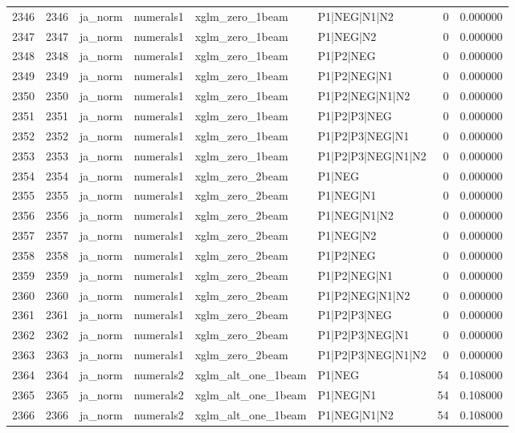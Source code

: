 \begin{tabular}{lrllllrr}
2346 & 2346 & ja_norm & numerals1 & xglm_zero_1beam & P1|NEG|N1|N2 & 0 & 0.000000 \\
2347 & 2347 & ja_norm & numerals1 & xglm_zero_1beam & P1|NEG|N2 & 0 & 0.000000 \\
2348 & 2348 & ja_norm & numerals1 & xglm_zero_1beam & P1|P2|NEG & 0 & 0.000000 \\
2349 & 2349 & ja_norm & numerals1 & xglm_zero_1beam & P1|P2|NEG|N1 & 0 & 0.000000 \\
2350 & 2350 & ja_norm & numerals1 & xglm_zero_1beam & P1|P2|NEG|N1|N2 & 0 & 0.000000 \\
2351 & 2351 & ja_norm & numerals1 & xglm_zero_1beam & P1|P2|P3|NEG & 0 & 0.000000 \\
2352 & 2352 & ja_norm & numerals1 & xglm_zero_1beam & P1|P2|P3|NEG|N1 & 0 & 0.000000 \\
2353 & 2353 & ja_norm & numerals1 & xglm_zero_1beam & P1|P2|P3|NEG|N1|N2 & 0 & 0.000000 \\
2354 & 2354 & ja_norm & numerals1 & xglm_zero_2beam & P1|NEG & 0 & 0.000000 \\
2355 & 2355 & ja_norm & numerals1 & xglm_zero_2beam & P1|NEG|N1 & 0 & 0.000000 \\
2356 & 2356 & ja_norm & numerals1 & xglm_zero_2beam & P1|NEG|N1|N2 & 0 & 0.000000 \\
2357 & 2357 & ja_norm & numerals1 & xglm_zero_2beam & P1|NEG|N2 & 0 & 0.000000 \\
2358 & 2358 & ja_norm & numerals1 & xglm_zero_2beam & P1|P2|NEG & 0 & 0.000000 \\
2359 & 2359 & ja_norm & numerals1 & xglm_zero_2beam & P1|P2|NEG|N1 & 0 & 0.000000 \\
2360 & 2360 & ja_norm & numerals1 & xglm_zero_2beam & P1|P2|NEG|N1|N2 & 0 & 0.000000 \\
2361 & 2361 & ja_norm & numerals1 & xglm_zero_2beam & P1|P2|P3|NEG & 0 & 0.000000 \\
2362 & 2362 & ja_norm & numerals1 & xglm_zero_2beam & P1|P2|P3|NEG|N1 & 0 & 0.000000 \\
2363 & 2363 & ja_norm & numerals1 & xglm_zero_2beam & P1|P2|P3|NEG|N1|N2 & 0 & 0.000000 \\
2364 & 2364 & ja_norm & numerals2 & xglm_alt_one_1beam & P1|NEG & 54 & 0.108000 \\
2365 & 2365 & ja_norm & numerals2 & xglm_alt_one_1beam & P1|NEG|N1 & 54 & 0.108000 \\
2366 & 2366 & ja_norm & numerals2 & xglm_alt_one_1beam & P1|NEG|N1|N2 & 54 & 0.108000 \\

\end{tabular}
